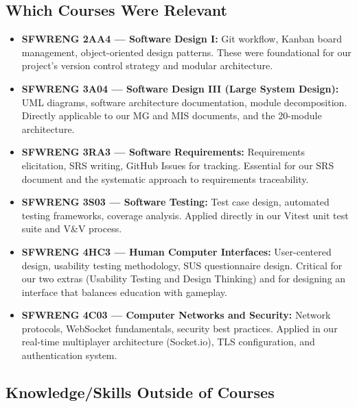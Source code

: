 \documentclass{article}
\begin{document}
\subsection{Which Courses Were Relevant}


\begin{itemize}
  \item \textbf{SFWRENG 2AA4 --- Software Design I:} Git workflow, Kanban board management, object-oriented design patterns. These were foundational for our project's version control strategy and modular architecture.
  \item \textbf{SFWRENG 3A04 --- Software Design III (Large System Design):} UML diagrams, software architecture documentation, module decomposition. Directly applicable to our MG and MIS documents, and the 20-module architecture.
  \item \textbf{SFWRENG 3RA3 --- Software Requirements:} Requirements elicitation, SRS writing, GitHub Issues for tracking. Essential for our SRS document and the systematic approach to requirements traceability.
  \item \textbf{SFWRENG 3S03 --- Software Testing:} Test case design, automated testing frameworks, coverage analysis. Applied directly in our Vitest unit test suite and V\&V process.
  \item \textbf{SFWRENG 4HC3 --- Human Computer Interfaces:} User-centered design, usability testing methodology, SUS questionnaire design. Critical for our two extras (Usability Testing and Design Thinking) and for designing an interface that balances education with gameplay.
  \item \textbf{SFWRENG 4C03 --- Computer Networks and Security:} Network protocols, WebSocket fundamentals, security best practices. Applied in our real-time multiplayer architecture (Socket.io), TLS configuration, and authentication system.
\end{itemize}

\subsection{Knowledge/Skills Outside of Courses}
\end{document}
